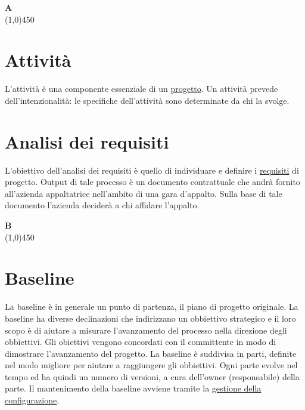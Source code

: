 





\copertina


\tableofcontents

\newpage
	{\Huge{\textbf{A}}} \\
	\line(1,0){450}
	
	\section{Attività}
	\label{sec:attivita}
	L'attività è una componente essenziale di un \hyperref[sec:progetto]{progetto}. Un attività prevede dell'intenzionalità: le specifiche dell'attività sono determinate da chi la svolge. 	
	
	\section{Analisi dei requisiti}
	\label{sec:analisirequisiti}
	L'obiettivo dell'analisi dei requisiti è quello di individuare e definire i \hyperref[sec:requisito]{requisiti} di progetto. Output di tale processo è un documento contrattuale che andrà fornito all'azienda appaltatrice nell'ambito di una gara d'appalto. Sulla base di tale documento l'azienda deciderà a chi affidare l'appalto. \newpage

	{\Huge{\textbf{B}}} \\
	\line(1,0){450}
	
	\section{Baseline}
	\label{sec:baseline}
	La baseline è in generale un punto di partenza, il piano di progetto originale. La baseline ha diverse declinazioni che indirizzano un obbiettivo strategico e il loro scopo è di aiutare a misurare l'avanzamento del processo nella direzione degli obbiettivi. Gli obiettivi vengono concordati con il committente in modo di dimostrare l'avanzamento del progetto. La baseline è suddivisa in parti, definite nel modo migliore per aiutare a raggiungere gli obbiettivi. Ogni parte evolve nel tempo ed ha quindi un numero di versioni, a cura dell'owner (responsabile) della parte. Il mantenimento della baseline avviene tramite la \hyperref[sec:controlloconfigurazione]{gestione della configurazione}. 
	
